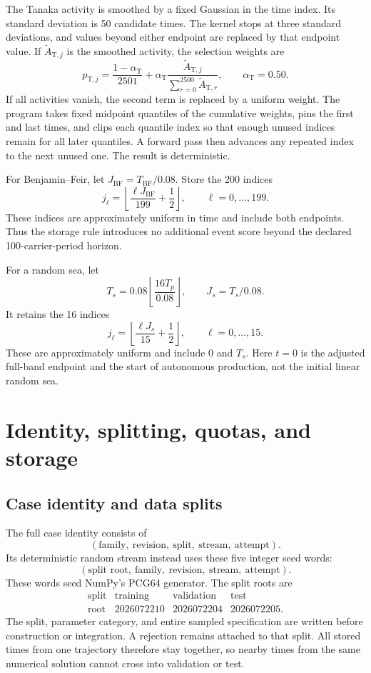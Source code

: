 \documentclass[10pt]{article}
\begin{document}
The Tanaka activity is smoothed by a fixed Gaussian in the time index.  Its
standard deviation is 50 candidate times.  The kernel stops at three standard
deviations, and values beyond either endpoint are replaced by that endpoint
value.  If $\widetilde A_{\mathrm T,j}$ is the smoothed activity, the
selection weights are
\[
  p_{\mathrm T,j}
  =
  \frac{1-\alpha_{\mathrm T}}{2501}
  +
  \alpha_{\mathrm T}
  \frac{\widetilde A_{\mathrm T,j}}
       {\sum_{r=0}^{2500}\widetilde A_{\mathrm T,r}},
  \qquad \alpha_{\mathrm T}=0.50.
\]
If all activities vanish, the second term is replaced by a uniform weight.
The program takes fixed midpoint quantiles of the cumulative weights, pins
the first and last times, and clips each quantile index so that enough unused
indices remain for all later quantiles.  A forward pass then advances any
repeated index to the next unused one.  The result is deterministic.

For Benjamin--Feir, let $J_{\mathrm{BF}}=T_{\mathrm{BF}}/0.08$.  Store the
200 indices
\[
  j_\ell
  =\left\lfloor\frac{\ell J_{\mathrm{BF}}}{199}+\frac12\right\rfloor,
  \qquad \ell=0,\ldots,199.
\]
These indices are approximately uniform in time and include both endpoints.
Thus the storage rule introduces no additional event score beyond the
declared 100-carrier-period horizon.

For a random sea, let
\[
  T_s=0.08\left\lfloor\frac{16T_p}{0.08}\right\rfloor,
  \qquad J_s=T_s/0.08.
\]
It retains the 16 indices
\[
  j_\ell=
  \left\lfloor\frac{\ell J_s}{15}+\frac12\right\rfloor,
  \qquad \ell=0,\ldots,15.
\]
These are approximately uniform and include $0$ and $T_s$.  Here $t=0$ is
the adjusted full-band endpoint and the start of autonomous production, not
the initial linear random sea.

\section{Identity, splitting, quotas, and storage}
\label{sec:records}

\subsection{Case identity and data splits}

The full case identity consists of
\[
  (\text{family},\ \text{revision},\ \text{split},\
    \text{stream},\ \text{attempt}).
\]
Its deterministic random stream instead uses these five integer seed words:
\[
  (\text{split root},\ \text{family},\ \text{revision},\
    \text{stream},\ \text{attempt}).
\]
These words seed NumPy's PCG64 generator.  The split roots are
\[
  \begin{array}{c|ccc}
    \text{split}&\text{training}&\text{validation}&\text{test}\\ \hline
    \text{root}&2026072210&2026072204&2026072205.
  \end{array}
\]
The split, parameter category, and entire sampled specification are written
before construction or integration.  A rejection remains attached to that
split.  All stored times from one trajectory therefore stay together, so
nearby times from the same numerical solution cannot cross into validation
or test.
\end{document}
